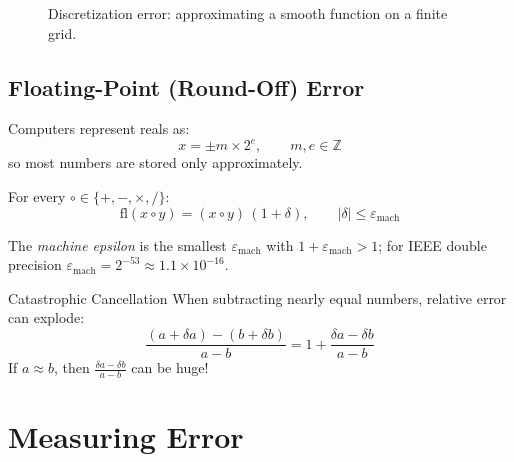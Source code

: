\begin{figure}[ht]
    \centering
    \caption{Discretization error: approximating a smooth function on a finite grid.}
    \label{fig:discretization}
\end{figure}

\subsection{Floating-Point (Round-Off) Error}
\label{subsec:roundoff-error}

Computers represent reals as:
\[
    x = \pm m \times 2^{e}, \qquad m,e\in\mathbb{Z}
\]
so most numbers are stored only approximately.

For every $\circ\in\{+,-,\times,/\}$:
\[
    \mathrm{fl}(x\circ y) = (x\circ y)\,(1+\delta), \qquad |\delta|\le\varepsilon_{\text{mach}}
\]

The \emph{machine epsilon} is the smallest $\varepsilon_{\text{mach}}$ with $1+\varepsilon_{\text{mach}}>1$; for IEEE double precision $\varepsilon_{\text{mach}}=2^{-53}\approx1.1\times10^{-16}$.

\begin{remark}{Catastrophic Cancellation}{}
    When subtracting nearly equal numbers, relative error can explode:
    \[
        \frac{(a + \delta a) - (b + \delta b)}{a - b} = 1 + \frac{\delta a - \delta b}{a - b}
    \]
    If $a \approx b$, then $\frac{\delta a - \delta b}{a - b}$ can be huge!
\end{remark}

\section{Measuring Error}
\label{sec:measuring-error}

